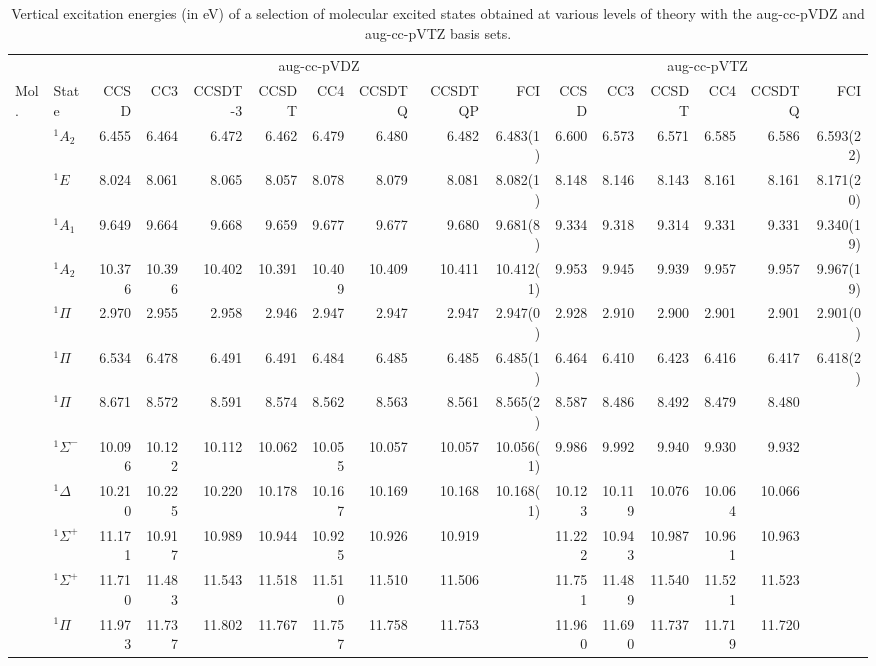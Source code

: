 \documentclass[aip,jcp,reprint,noshowkeys,superscriptaddress]{revtex4-1}
\newcommand{\mc}{\multicolumn}
\begin{document}
\begin{squeezetable}
\begin{table*}
	\caption{Vertical excitation energies (in eV) of a selection of molecular excited states obtained at various levels of theory with the aug-cc-pVDZ and aug-cc-pVTZ basis sets.
	\label{tab:BigTab}}
	\begin{ruledtabular}
	\begin{tabular}{llrrrrrrrrrrrrrr}
				&		&	\mc{8}{c}{aug-cc-pVDZ}		&		\mc{6}{c}{aug-cc-pVTZ}		\\	
				\cline{3-10} \cline{11-16}
	Mol.	&	State				&CCSD	&CC3	&CCSDT-3&CCSDT	&CC4	&CCSDTQ	&CCSDTQP	&FCI	
									&CCSD	&CC3	&CCSDT	&CC4	&CCSDTQ	&FCI			\\
	\hline
	\ce{NH3}	&	$^1A_2$ 		&6.455	&6.464	&6.472	&6.462	&6.479	&6.480	&6.482	&6.483(1)	&6.600	&6.573	&6.571	&6.585	&6.586	&6.593(22)	\\	
				&	$^1E$			&8.024	&8.061	&8.065	&8.057	&8.078	&8.079	&8.081	&8.082(1)	&8.148	&8.146	&8.143	&8.161	&8.161	&8.171(20)	\\	
				&	$^1A_1$ 		&9.649	&9.664	&9.668	&9.659	&9.677	&9.677	&9.680	&9.681(8)	&9.334	&9.318	&9.314	&9.331	&9.331	&9.340(19)	\\
				&	$^1A_2$ 		&10.376	&10.396	&10.402	&10.391	&10.409	&10.409	&10.411	&10.412(1)	&9.953	&9.945	&9.939	&9.957	&9.957	&9.967(19)	\\
	\ce{BH}		&	$^1\Pi$ 		&2.970	&2.955	&2.958	&2.946	&2.947	&2.947	&2.947	&2.947(0)	&2.928	&2.910	&2.900	&2.901	&2.901	&2.901(0)	\\
	\ce{BF}		&	$^1\Pi$ 		&6.534	&6.478	&6.491	&6.491	&6.484	&6.485	&6.485	&6.485(1)	&6.464	&6.410	&6.423	&6.416	&6.417	&6.418(2)\\
	\ce{CO}		&	$^1\Pi$ 		&8.671	&8.572	&8.591	&8.574	&8.562	&8.563	&8.561	&8.565(2)	&8.587	&8.486	&8.492	&8.479	&8.480	&	\\
				&	$^1\Sigma^-$ 	&10.096	&10.122	&10.112	&10.062	&10.055	&10.057	&10.057	&10.056(1)	&9.986	&9.992	&9.940	&9.930	&9.932	&	\\
				&	$^1\Delta$ 		&10.210	&10.225	&10.220	&10.178	&10.167	&10.169	&10.168	&10.168(1)	&10.123	&10.119	&10.076	&10.064	&10.066	&	\\
				&	$^1\Sigma^+$ 	&11.171	&10.917	&10.989	&10.944	&10.925	&10.926	&10.919	&			&11.222	&10.943	&10.987	&10.961	&10.963	&	\\
				&	$^1\Sigma^+$ 	&11.710	&11.483	&11.543	&11.518	&11.510	&11.510	&11.506	&			&11.751	&11.489	&11.540	&11.521	&11.523	&	\\
				&	$^1\Pi$ 		&11.973	&11.737	&11.802	&11.767	&11.757	&11.758	&11.753	&			&11.960	&11.690	&11.737	&11.719	&11.720	&	\\

\end{tabular}
\end{ruledtabular}
\end{table*}
\end{squeezetable}
\end{document}

